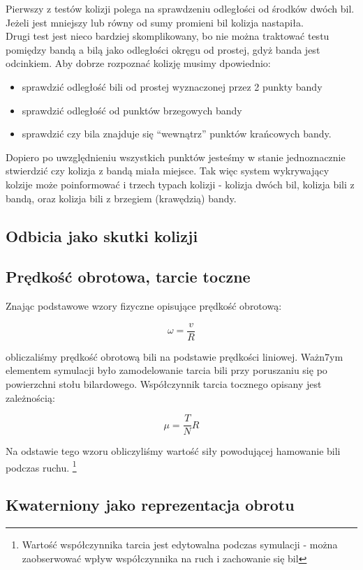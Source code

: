 Pierwszy z testów kolizji polega na sprawdzeniu odległości od środków dwóch bil. Jeżeli jest mniejszy lub równy od sumy promieni bil kolizja nastapiła.\\
Drugi test jest nieco bardziej skomplikowany, bo nie można traktować testu pomiędzy bandą a bilą jako odległości okręgu od prostej, gdyż banda jest odcinkiem. Aby dobrze rozpoznać kolizję musimy dpowiednio:

\begin{itemize}
 \item sprawdzić odległość bili od prostej wyznaczonej przez 2 punkty bandy
 \item sprawdzić odległość od punktów brzegowych bandy
 \item sprawdzić czy bila znajduje się ``wewnątrz'' punktów krańcowych bandy.
\end{itemize}

Dopiero po uwzględnieniu wszystkich punktów jesteśmy w stanie jednoznacznie stwierdzić czy kolizja z bandą miała miejsce.
Tak więc system wykrywający kolzije może poinformować i trzech typach kolizji - kolizja dwóch bil, kolizja bili z bandą, 
oraz kolizja bili z brzegiem (krawędzią) bandy.


\subsection{Odbicia jako skutki kolizji}
\subsection{Prędkość obrotowa, tarcie toczne}

Znając podstawowe wzory fizyczne opisujące prędkość obrotową:

\begin{equation}
\omega = \frac{v}{R}
\end{equation}

obliczaliśmy prędkość obrotową bili na podstawie prędkości liniowej. Ważn7ym elementem symulacji było 
zamodelowanie tarcia bili przy poruszaniu się po powierzchni stołu bilardowego. Współczynnik tarcia tocznego 
opisany jest zależnością:

\begin{equation}
\mu = \frac{T}{N}R
\end{equation}

Na odstawie tego wzoru obliczyliśmy wartość siły powodującej hamowanie bili podczas ruchu.
\footnote{Wartość współczynnika tarcia jest edytowalna podczas symulacji - można zaobserwować wpływ 
współczynnika na ruch i zachowanie się bil}

\subsection{Kwaterniony jako reprezentacja obrotu}
